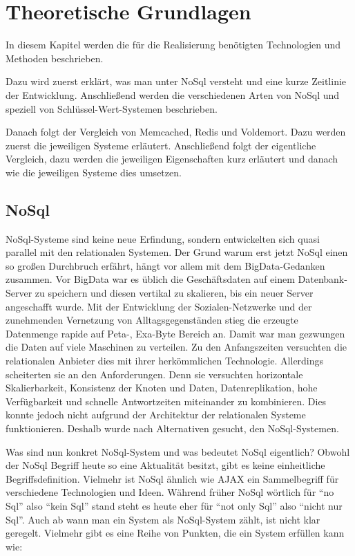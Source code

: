 \chapter{Theoretische Grundlagen}
In diesem Kapitel werden die für die Realisierung benötigten Technologien und
Methoden beschrieben.

Dazu wird zuerst erklärt, was man unter NoSql versteht und eine kurze Zeitlinie
der Entwicklung. Anschließend werden die verschiedenen Arten von NoSql und
speziell von Schlüssel-Wert-Systemen beschrieben.

Danach folgt der Vergleich von Memcached, Redis und Voldemort. Dazu werden
zuerst die jeweiligen Systeme erläutert. Anschließend folgt der eigentliche
Vergleich, dazu werden die jeweiligen Eigenschaften kurz erläutert und danach
wie die jeweiligen Systeme dies umsetzen.

\section{NoSql}
NoSql-Systeme sind keine neue Erfindung, sondern entwickelten sich quasi
parallel mit den relationalen Systemen. Der Grund warum erst jetzt NoSql einen
so großen Durchbruch erfährt, hängt vor allem mit dem \gls{BigData}-Gedanken
zusammen. Vor BigData war es üblich die Geschäftsdaten auf einem
Datenbank-Server zu speichern und diesen vertikal zu skalieren, bis ein neuer
Server angeschafft wurde. Mit der Entwicklung der Sozialen-Netzwerke und der
zunehmenden Vernetzung von Alltagsgegenständen stieg die erzeugte Datenmenge
rapide auf Peta-, Exa-Byte Bereich an. Damit war man gezwungen die Daten auf
viele Maschinen zu verteilen. Zu den Anfangszeiten versuchten die relationalen
Anbieter dies mit ihrer herkömmlichen Technologie. Allerdings scheiterten sie an
den Anforderungen. Denn sie versuchten horizontale Skalierbarkeit, Konsistenz
der Knoten und Daten, Datenreplikation, hohe Verfügbarkeit und schnelle
Antwortzeiten miteinander zu kombinieren. Dies konnte jedoch nicht aufgrund der
Architektur der relationalen Systeme funktionieren. Deshalb wurde nach
Alternativen gesucht, den NoSql-Systemen.

Was sind nun konkret NoSql-System und was bedeutet NoSql eigentlich? Obwohl der
NoSql Begriff heute so eine Aktualität besitzt, gibt es keine einheitliche
Begriffsdefinition. Vielmehr ist NoSql ähnlich wie \gls{AJAX} ein Sammelbegriff
für verschiedene Technologien und Ideen. Während früher NoSql wörtlich
für \enquote{no Sql} also \enquote{kein Sql} stand steht es heute eher für
\enquote{not only Sql} also \enquote{nicht nur Sql}. Auch ab wann man ein System
als NoSql-System zählt, ist nicht klar geregelt. Vielmehr gibt es eine Reihe von
Punkten, die ein System erfüllen kann wie: \cite{Edlich2011}

